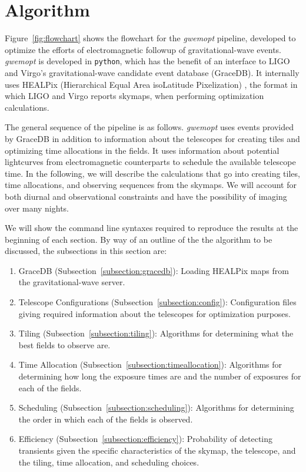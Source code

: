 \documentclass[twocolumn]{aastex62}
\begin{document}
\section{Algorithm}
\label{sec:algorithm}

Figure~\ref{fig:flowchart} shows the flowchart for the \emph{gwemopt} pipeline, developed to optimize the efforts of electromagnetic followup of gravitational-wave events.  \emph{gwemopt} is developed in \texttt{python}, which has the benefit of an interface to LIGO and Virgo's gravitational-wave candidate event database (GraceDB). It internally uses HEALPix (Hierarchical Equal Area isoLatitude Pixelization) \citep{GoHi2005}, the format in which LIGO and Virgo reports skymaps, when performing optimization calculations. 

The general sequence of the pipeline is as follows.
\emph{gwemopt} uses events provided by GraceDB in addition to information about the telescopes for creating tiles and optimizing time allocations in the fields.
It uses information about potential lightcurves from electromagnetic counterparts to schedule the available telescope time.
In the following, we will describe the calculations that go into creating tiles, time allocations, and observing sequences from the skymaps.
We will account for both diurnal and observational constraints and have the possibility of imaging over many nights.

We will show the command line syntaxes required to reproduce the results at the beginning of each section.
By way of an outline of the the algorithm to be discussed, the subsections in this section are:
\begin{enumerate}
\item GraceDB (Subsection~\ref{subsection:gracedb}): Loading HEALPix maps from the gravitational-wave server.
\item Telescope Configurations (Subsection~\ref{subsection:config}): Configuration files giving required information about the telescopes for optimization purposes.
\item Tiling (Subsection~\ref{subsection:tiling}): Algorithms for determining what the best fields to observe are.
\item Time Allocation (Subsection~\ref{subsection:timeallocation}): Algorithms for determining how long the exposure times are and the number of exposures for each of the fields.
\item Scheduling (Subsection~\ref{subsection:scheduling}): Algorithms for determining the order in which each of the fields is observed.
\item Efficiency (Subsection~\ref{subsection:efficiency}): Probability of detecting transients given the specific characteristics of the skymap, the telescope, and the tiling, time allocation, and scheduling choices.
\end{enumerate}
\end{document}
